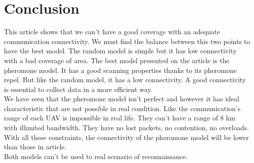\part{Conclusion}

This article shows that we can't have a good coverage with an adequate communication connectivity. We must find the balance between this two points to have the best model. The random model is simple but it has low connectivity with a bad coverage of area. The best model presented on the article is the pheromone model. It has a good scanning properties thanks to its pheromone repel. But like the random model, it has a low connectivity. A good connectivity is essential to collect data in a more efficient way.\\

We have seen that the pheromone model isn't perfect and however it has ideal characteristic that are not possible in real condition. Like the communication's range of each UAV is impossible in real life. They can't have a range of 8 km with illimited bandwidth. They have no lost packets,  no contention, no overloads. With all these constraints, the connectivity of the pheromone model will be lower than those in article.\\
Both models can't be used to real scenario of reconnaissance.